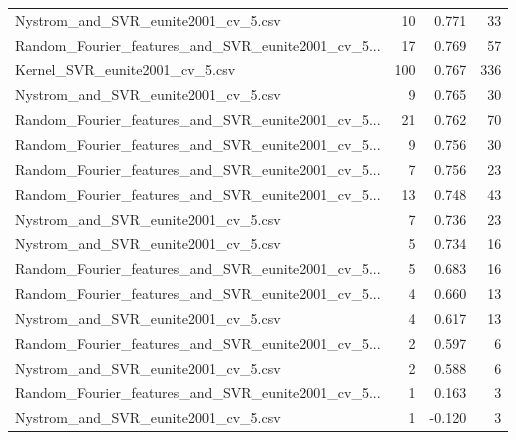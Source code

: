 \begin{tabularx}{\textwidth}{lrrr}
               Nystrom\_and\_SVR\_eunite2001\_cv\_5.csv &       10 &               0.771 &            33 \\
Random\_Fourier\_features\_and\_SVR\_eunite2001\_cv\_5... &       17 &               0.769 &            57 \\
                    Kernel\_SVR\_eunite2001\_cv\_5.csv &      100 &               0.767 &           336 \\
               Nystrom\_and\_SVR\_eunite2001\_cv\_5.csv &        9 &               0.765 &            30 \\
Random\_Fourier\_features\_and\_SVR\_eunite2001\_cv\_5... &       21 &               0.762 &            70 \\
Random\_Fourier\_features\_and\_SVR\_eunite2001\_cv\_5... &        9 &               0.756 &            30 \\
Random\_Fourier\_features\_and\_SVR\_eunite2001\_cv\_5... &        7 &               0.756 &            23 \\
Random\_Fourier\_features\_and\_SVR\_eunite2001\_cv\_5... &       13 &               0.748 &            43 \\
               Nystrom\_and\_SVR\_eunite2001\_cv\_5.csv &        7 &               0.736 &            23 \\
               Nystrom\_and\_SVR\_eunite2001\_cv\_5.csv &        5 &               0.734 &            16 \\
Random\_Fourier\_features\_and\_SVR\_eunite2001\_cv\_5... &        5 &               0.683 &            16 \\
Random\_Fourier\_features\_and\_SVR\_eunite2001\_cv\_5... &        4 &               0.660 &            13 \\
               Nystrom\_and\_SVR\_eunite2001\_cv\_5.csv &        4 &               0.617 &            13 \\
Random\_Fourier\_features\_and\_SVR\_eunite2001\_cv\_5... &        2 &               0.597 &             6 \\
               Nystrom\_and\_SVR\_eunite2001\_cv\_5.csv &        2 &               0.588 &             6 \\
Random\_Fourier\_features\_and\_SVR\_eunite2001\_cv\_5... &        1 &               0.163 &             3 \\
               Nystrom\_and\_SVR\_eunite2001\_cv\_5.csv &        1 &              -0.120 &             3 \\
\bottomrule
\end{tabularx}
